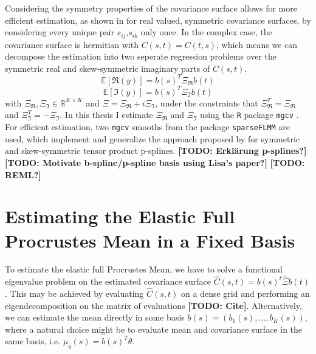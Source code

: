 Considering the symmetry properties of the covariance surface allows for more efficient estimation, as shown in \cite{CederbaumScheiplGreven2018} for real valued, symmetric covariance surfaces, by considering every unique pair $s_{ij}$,$s_{ik}$ only once.
In the complex case, the covariance surface is hermitian with $C(s,t) = \overline{C(t,s)}$, which means we can decompose the estimation into two seperate regression problems over the symmetric real and skew-symmetric imaginary parts of $C(s,t)$.
$$\mathbb{E}[\Re(y)] = b(s)^T \Xi_{\Re} b(t)$$
$$\mathbb{E}[\Im(y)] = b(s)^T \Xi_{\Im} b(t)$$
with $\Xi_\Re, \Xi_\Im \in \mathbb{R}^{K\times K}$ and $\Xi = \Xi_\Re + i \Xi_\Im$, under the constraints that $\Xi_\Re^T = \Xi_\Re$ and $\Xi_\Im^T = - \Xi_\Im$.
In this thesis I estimate $\Xi_\Re$ and $\Xi_\Im$ using the \texttt{R} \parencite{Rcore} package \texttt{mgcv} \parencite{Wood2017}.
For efficient estimation, two \texttt{mgcv} smooths from the package \texttt{sparseFLMM} \parencite{sparseFLMM} are used, which implement and generalize the approach proposed by \cite{CederbaumScheiplGreven2018} for symmetric and skew-symmetric tensor product p-splines.
\textbf{[TODO: Erklärung p-splines?]}
\textbf{[TODO: Motivate b-spline/p-spline basis using Lisa's paper?]}
\textbf{[TODO: REML?]}


\section{Estimating the Elastic Full Procrustes Mean in a Fixed Basis}
\label{sec:mean_basis}
To estimate the elastic full Procrustes Mean, we have to solve a functional eigenvalue problem on the estimated covariance surface $\hat{C}(s,t) = b(s)^t \hat\Xi b(t)$.
This may be achieved by evaluating $\hat{C}(s,t)$ on a dense grid and performing an eigendecomposition on the matrix of evaluations \textbf{[TODO: Cite]}.
Alternatively, we can estimate the mean directly in some basis $b(s) = (b_1(s),\dots,b_K(s))$, where a natural choice might be to evaluate mean and covariance surface in the same basis, i.e. $\mu_q(s) = b(s)^T \theta$.

